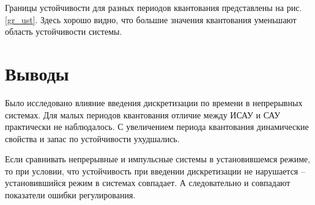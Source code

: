 	Границы устойчивости для разных периодов квантования представлены на рис. \ref{gr_ust}. Здесь хорошо видно, что большие значения квантования уменьшают область устойчивости системы.
	
	\begin{center}
		\label{gr_ust}
	\end{center}
	
	\section{Выводы}
	
	Было исследовано влияние введения дискретизации по времени в непрерывных системах. Для малых периодов квантования отличие между ИСАУ и САУ практически не наблюдалось. С увеличением периода квантования динамические свойства и запас по устойчивости ухудшались. 
	
	Если сравнивать непрерывные и импульсные системы в установившемся режиме, то при условии, что устойчивость при введении дискретизации не нарушается -- установившийся режим в системах совпадает. А следовательно и совпадают показатели ошибки регулирования.
	
		

